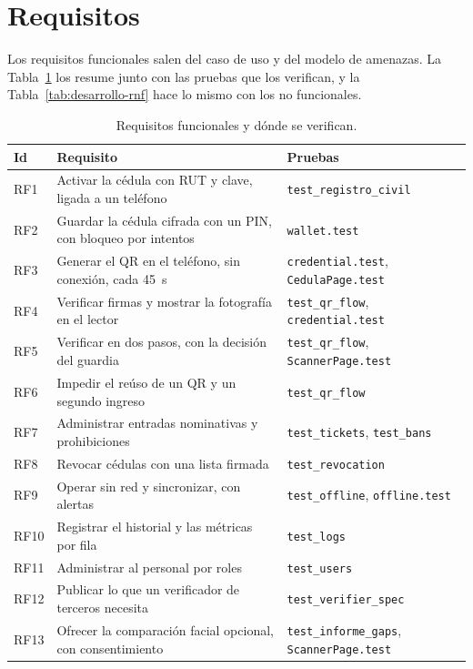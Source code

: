 \section{Requisitos}
\label{sec:desarrollo-requisitos}

Los requisitos funcionales salen del caso de uso y del modelo de amenazas. La
Tabla~\ref{tab:desarrollo-rf} los resume junto con las pruebas que los verifican, y la
Tabla~\ref{tab:desarrollo-rnf} hace lo mismo con los no funcionales.

\begin{table}[htbp]
  \centering
  \caption{Requisitos funcionales y dónde se verifican.}
  \label{tab:desarrollo-rf}
  \small
  \begin{tabular}{lp{7.6cm}p{5.0cm}}
    \toprule
    Id & Requisito & Pruebas \\
    \midrule
    RF1 & Activar la cédula con RUT y clave, ligada a un teléfono & \texttt{test\_registro\_civil} \\
    RF2 & Guardar la cédula cifrada con un PIN, con bloqueo por intentos & \texttt{wallet.test} \\
    RF3 & Generar el QR en el teléfono, sin conexión, cada 45~s & \texttt{credential.test}, \texttt{CedulaPage.test} \\
    RF4 & Verificar firmas y mostrar la fotografía en el lector & \texttt{test\_qr\_flow}, \texttt{credential.test} \\
    RF5 & Verificar en dos pasos, con la decisión del guardia & \texttt{test\_qr\_flow}, \texttt{ScannerPage.test} \\
    RF6 & Impedir el reúso de un QR y un segundo ingreso & \texttt{test\_qr\_flow} \\
    RF7 & Administrar entradas nominativas y prohibiciones & \texttt{test\_tickets}, \texttt{test\_bans} \\
    RF8 & Revocar cédulas con una lista firmada & \texttt{test\_revocation} \\
    RF9 & Operar sin red y sincronizar, con alertas & \texttt{test\_offline}, \texttt{offline.test} \\
    RF10 & Registrar el historial y las métricas por fila & \texttt{test\_logs} \\
    RF11 & Administrar al personal por roles & \texttt{test\_users} \\
    RF12 & Publicar lo que un verificador de terceros necesita & \texttt{test\_verifier\_spec} \\
    RF13 & Ofrecer la comparación facial opcional, con consentimiento & \texttt{test\_informe\_gaps}, \texttt{ScannerPage.test} \\
    \bottomrule
  \end{tabular}
\end{table}

